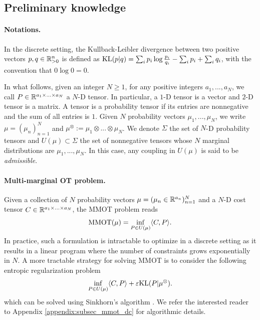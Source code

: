 \subsection{Preliminary knowledge}

\paragraph{Notations.} In the discrete setting, the
Kullback-Leibler divergence between two positive vectors $p, q \in \mathbb R^n_{> 0}$
is defined as $\text{KL}(p | q) = \sum_i p_i \log \frac{p_i}{q_i} - \sum_i p_i + \sum_i q_i$,
with the convention that $0 \log 0 = 0$.

In what follows, given an integer $N \geq 1$, for any positive integers $a_1,..., a_N$, we call
$P \in \mathbb R^{a_1 \times ... \times a_N}$ a $N$-D tensor. In particular, a $1$-D tensor is a vector and $2$-D tensor is a matrix.
A tensor is a probability tensor if its entries are nonnegative and the sum of all entries is $1$.
Given $N$ probability vectors $\mu_1, ..., \mu_N$, we write $\mu = (\mu_n)_{n=1}^N$
and $\mu^{\otimes} := \mu_1 \otimes ... \otimes \mu_N$.
We denote $\Sigma$ the set of $N$-D probability tensors and $U(\mu) \subset \Sigma$ the set of nonnegative tensors whose $N$
marginal distributions are $\mu_1, ..., \mu_N$. In this case, any coupling in $U(\mu)$ is said to be \textit{admissible}.

\paragraph{Multi-marginal OT problem.} Given a collection of $N$ probability vectors $\mu = (\mu_n \in \mathbb R^{a_n})_{n=1}^N$
and a $N$-D cost tensor $C \in \mathbb R^{a_1 \times ... \times a_N}$, the MMOT problem reads
\begin{equation*}
  \text{MMOT}(\mu) = \inf_{P \in U(\mu)} \langle C, P \rangle.
\end{equation*}
In practice, such a formulation is intractable to optimize in a discrete setting as it results in a linear program where the number
of constraints grows exponentially in $N$. A more tractable strategy for solving MMOT is to consider the following entropic
regularization problem
\begin{equation} \label{MMOT_primal}
  \inf_{P \in U(\mu)} \langle C, P \rangle + \varepsilon \text{KL}(P | \mu^{\otimes}).
\end{equation}
which can be solved using Sinkhorn's algorithm \citep{Benamou14}.
We refer the interested reader to Appendix \ref{appendix:subsec_mmot_dc} for algorithmic details.

